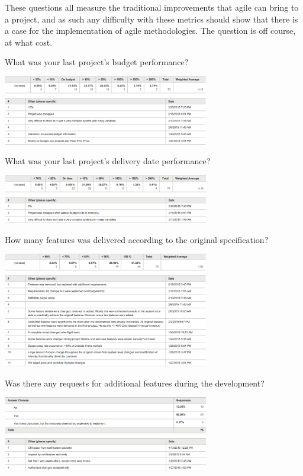 \documentclass{sig-alternate-05-2015}
\begin{document}
These questions all measure the traditional improvements that agile can bring to a project, and as such any difficulty with these metrics should show that there is a case for the implementation of agile methodologies. The question is off course, at what cost.

\begin{table}[t!]
	\centering
	\caption{What was your last project's budget performance?}
	\includegraphics[width=90mm]{What_was_your_last_projects_budget_performance.png}
\end{table}

\begin{table}[t!]
	\centering
	\caption{What was your last project's delivery date performance?}
	\includegraphics[width=90mm]{What_was_your_last_projects_delivery_date_performance.png}
\end{table}

\begin{table}[t!]
	\centering
	\caption{How many features was delivered according to the original specification?}
	\includegraphics[width=90mm]{How_many_features_was_delivered_according_to_the_original_specification.png}
\end{table}

\begin{table}[t!]
	\centering
	\caption{Was there any requests for additional features during the development?}
	\includegraphics[width=90mm]{Was_there_any_requests_for_additional_features_during_the_development.png}
\end{table}
\end{document}
